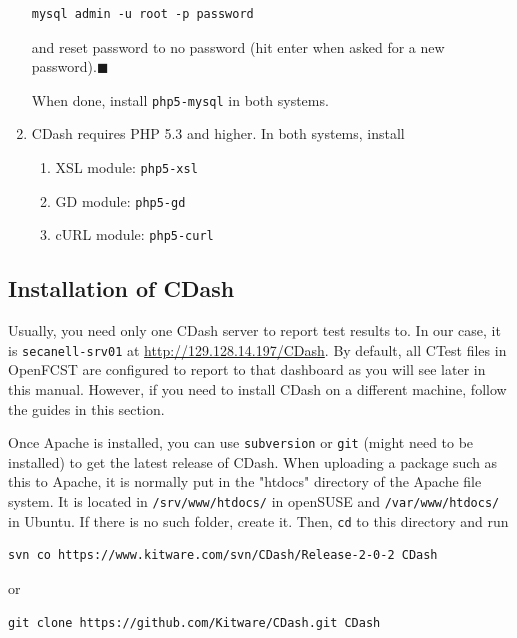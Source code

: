\begin{enumerate}
\small \begin{lstlisting}
mysql admin -u root -p password
\end{lstlisting}\normalsize

\noindent and reset password to no password (hit enter when asked for a new password).\hfill$\blacksquare$

\bigskip

When done, install \verb!php5-mysql! in both systems.

\item CDash requires PHP 5.3 and higher. In both systems, install
\begin{enumerate}
 \item XSL module: \verb!php5-xsl!
 \item GD module: \verb!php5-gd!
 \item cURL module: \verb!php5-curl!
\end{enumerate}

\end{enumerate}

\subsection{Installation of CDash} \label{sec:Installation}

Usually, you need only one CDash server to report test results to. In our case, it is \verb!secanell-srv01! at \url{http://129.128.14.197/CDash}. By default, all CTest files in OpenFCST are configured to report to that dashboard as you will see later in this manual. However, if you need to install CDash on a different machine, follow the guides in this section.

Once Apache is installed, you can use \verb!subversion! or \verb!git! (might need to be installed) to get the latest release of CDash. When uploading a package such as this to Apache, it is normally put in the "htdocs" directory of the Apache file system. It is located in \verb!/srv/www/htdocs/! in openSUSE and \verb!/var/www/htdocs/! in Ubuntu. If there is no such folder, create it. Then, \verb!cd! to this directory and run

\small \begin{lstlisting}
svn co https://www.kitware.com/svn/CDash/Release-2-0-2 CDash
\end{lstlisting}\normalsize

\noindent or

\small \begin{lstlisting}
git clone https://github.com/Kitware/CDash.git CDash
\end{lstlisting}\normalsize

